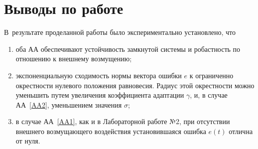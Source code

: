 \section{Выводы по работе}
В~результате проделанной работы было экспериментально установлено, что 
\begin{enumerate}
	\item оба АА обеспечивают устойчивость замкнутой системы и робастность по отношению к внешнему возмущению;
	\item экспоненциальную сходимость нормы вектора ошибки $e$ к ограниченно окрестности нулевого положения равновесия. Радиус этой окрестности можно уменьшить путем увеличения коэффициента адаптации $\gamma$, и, в случае АА~\ref{AA2}, уменьшением значения $\sigma$;
	\item в случае АА~\ref{AA1}, как и в Лабораторной работе №2, при отсутствии внешнего возмущающего воздействия установившаяся ошибка $e(t)$ отлична от нуля.
\end{enumerate}
